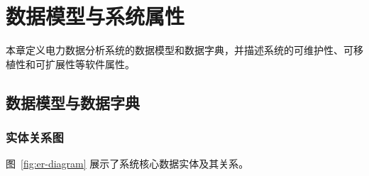 \chapter{数据模型与系统属性}

本章定义电力数据分析系统的数据模型和数据字典，并描述系统的可维护性、可移植性和可扩展性等软件属性。

\section{数据模型与数据字典}

\subsection{实体关系图}

图~\ref{fig:er-diagram} 展示了系统核心数据实体及其关系。

